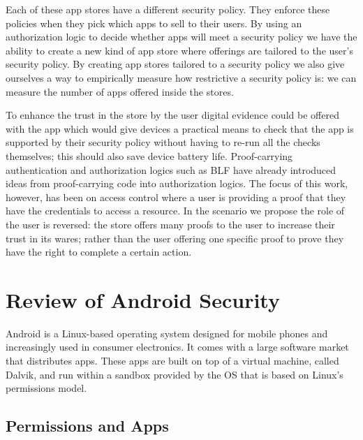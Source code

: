 \documentclass[a4paper,12pt,sfsidenotes]{tufte-book}
\begin{document}
Each of these app stores have a different security policy.  They enforce these
policies when they pick which apps to sell to their users.  By using an
authorization logic to decide whether apps will meet a security policy we have
the ability to create a new kind of app store where offerings are tailored to
the user's security policy.  By creating app stores tailored to a security
policy we also give ourselves a way to empirically measure how restrictive a
security policy is: we can measure the number of apps offered inside the stores.

To enhance the trust in the store by the user digital evidence could be offered
with the app which would give devices a practical means to check that the app is
supported by their security policy without having to re-run all the checks
themselves; this should also save device battery life.  Proof-carrying
authentication\cite{Appel:1999dq} and authorization logics such as
BLF\cite{Whitehead:2004bu} have already introduced ideas from proof-carrying
code into authorization logics. The focus of this work, however, has been on
access control where a user is providing a proof that they have the credentials
to access a resource.   In the scenario we propose the role of the user is
reversed: the store offers many proofs to the user to increase their trust in
its wares; rather than the user offering one specific proof to prove they have
the right to complete a certain action.

\section{Review of Android Security}

Android is a Linux-based operating system designed for mobile phones and
increasingly used in consumer electronics. It comes with a large software
market that distributes apps. These apps are built on top of a virtual machine,
called Dalvik, and run within a sandbox provided by the OS that is based on
Linux's permissions model\cite{Drake:2014uq}.

\subsection{Permissions and Apps}
\end{document}
